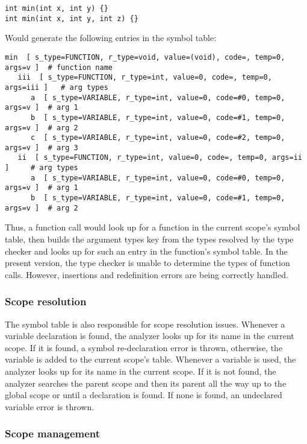 \begin{lstlisting}
int min(int x, int y) {}
int min(int x, int y, int z) {}
\end{lstlisting}

Would generate the following entries in the symbol table:

\begin{lstlisting}
min  [ s_type=FUNCTION, r_type=void, value=(void), code=, temp=0, args=v ]  # function name
   iii  [ s_type=FUNCTION, r_type=int, value=0, code=, temp=0, args=iii ]   # arg types
      a  [ s_type=VARIABLE, r_type=int, value=0, code=#0, temp=0, args=v ]  # arg 1
      b  [ s_type=VARIABLE, r_type=int, value=0, code=#1, temp=0, args=v ]  # arg 2
      c  [ s_type=VARIABLE, r_type=int, value=0, code=#2, temp=0, args=v ]  # arg 3
   ii  [ s_type=FUNCTION, r_type=int, value=0, code=, temp=0, args=ii ]     # arg types
      a  [ s_type=VARIABLE, r_type=int, value=0, code=#0, temp=0, args=v ]  # arg 1
      b  [ s_type=VARIABLE, r_type=int, value=0, code=#1, temp=0, args=v ]  # arg 2
\end{lstlisting}


Thus, a function call would look up for a function in the current scope's symbol table,
then builds the argument types key from the types resolved by the type checker and looks
up for such an entry in the function's symbol table. In the present version, the type checker
is unable to determine the types of function calls. However, insertions and redefinition
errors are being correctly handled.

\subsubsection{Scope resolution}

The symbol table is also responsible for scope resolution issues. Whenever a variable declaration
is found, the analyzer looks up for its name in the current scope. If it is found, a symbol
re-declaration error is thrown, otherwise, the variable is added to the current scope's table.
Whenever a variable is used, the analyzer looks up for its name in the current scope. If it is
not found, the analyzer searches the parent scope and then its parent all the way up to the global
scope or until a declaration is found. If none is found, an undeclared variable error is thrown.

\subsubsection{Scope management}

